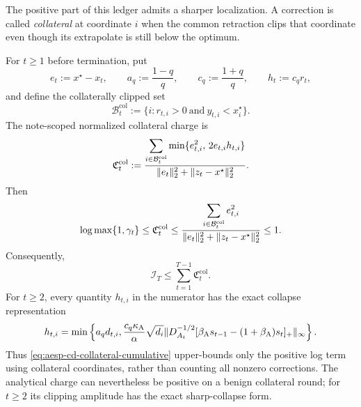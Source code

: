 The positive part of this ledger admits a sharper localization.  A correction
is called \emph{collateral} at coordinate $i$ when the common retraction clips
that coordinate even though its extrapolate is still below the optimum.

\begin{lemma}
\label{lem:aesp-cd-collateral-charge}
For $t\geq1$ before termination, put
\begin{equation*}
 e_t:=x^\star-x_t,
 \qquad
 a_q:=\frac{1-q}{q},
 \qquad
 c_q:=\frac{1+q}{q},
 \qquad
 h_t:=c_qr_t,
\end{equation*}
and define the collaterally clipped set
\begin{equation}
 \mathcal B_t^{\mathrm{col}}
 :=\{i:r_{t,i}>0\ \text{and}\ y_{t,i}<x_i^\star\}.
 \label{eq:aesp-cd-collateral-set}
\end{equation}
The note-scoped normalized collateral charge is
\begin{equation}
 \mathfrak C_t^{\mathrm{col}}
 :=\frac{
  \displaystyle\sum_{i\in\mathcal B_t^{\mathrm{col}}}
  \min\{e_{t,i}^2,\,2e_{t,i}h_{t,i}\}}
 {\lVert e_t\rVert_2^2+\lVert z_t-x^\star\rVert_2^2}.
 \label{eq:aesp-cd-collateral-charge}
\end{equation}
Then
\begin{equation}
 \log\max\{1,\gamma_t\}
 \leq\mathfrak C_t^{\mathrm{col}}
 \leq
 \frac{\displaystyle\sum_{i\in\mathcal B_t^{\mathrm{col}}}e_{t,i}^2}
      {\lVert e_t\rVert_2^2+\lVert z_t-x^\star\rVert_2^2}
 \leq1.
 \label{eq:aesp-cd-positive-only-charge}
\end{equation}
Consequently,
\begin{equation}
 \mathcal I_T
 \leq\sum_{t=1}^{T-1}\mathfrak C_t^{\mathrm{col}}.
 \label{eq:aesp-cd-collateral-cumulative}
\end{equation}
For $t\geq2$, every quantity $h_{t,i}$ in the numerator has the exact
collapse representation
\begin{equation}
 h_{t,i}
 =\min\left\{
 a_qd_{t,i},
 \frac{c_q\kappa_{\mathrm A}}{\alpha}\sqrt{d_i}
 \lVert D_{A_t}^{-1/2}
 [\beta_{\mathrm A}s_{t-1}-(1+\beta_{\mathrm A})s_t]_+\rVert_\infty
 \right\}.
 \label{eq:aesp-cd-collateral-collapse}
\end{equation}
Thus \cref{eq:aesp-cd-collateral-cumulative} upper-bounds only the positive
log term using collateral coordinates, rather than counting all nonzero
corrections.  The analytical charge can nevertheless be positive on a benign
collateral round; for $t\geq2$ its clipping amplitude has the exact
sharp-collapse form.
\end{lemma}

